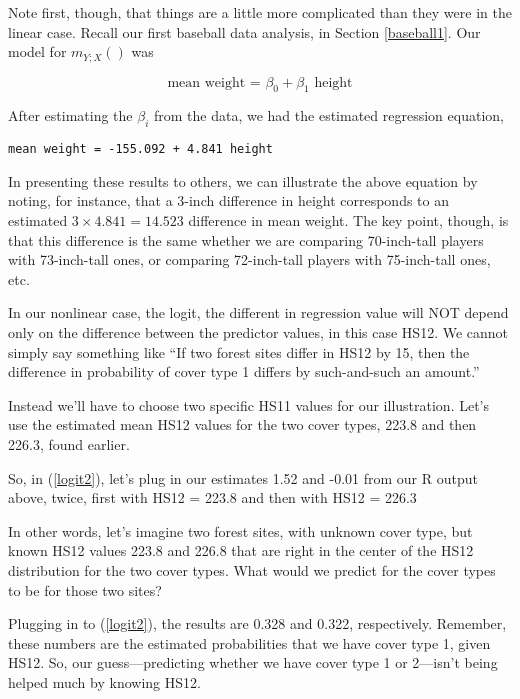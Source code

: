 Note first, though, that things are a little more complicated than they
were in the linear case.  Recall our first baseball data analysis, in
Section \ref{baseball1}.  Our model for $m_{Y;X}()$ was

\begin{equation}
\textrm{mean weight = } 
\beta_0 + \beta_1 \textrm{ height}
\end{equation}

After estimating the $\beta_i$ from the data, we had the estimated
regression equation,

\begin{lstlisting}
mean weight = -155.092 + 4.841 height
\end{lstlisting}

In presenting these results to others, we can illustrate the above
equation by noting, for instance, that a 3-inch difference in height
corresponds to an estimated $3 \times 4.841 = 14.523$ difference in mean
weight.  The key point, though, is that this difference is the same
whether we are comparing 70-inch-tall players with 73-inch-tall ones, or
comparing 72-inch-tall players with 75-inch-tall ones, etc.  

In our nonlinear case, the logit, the different in regression value will
NOT depend only on the difference between the predictor values, in this
case HS12.  We cannot simply say something like ``If two forest sites
differ in HS12 by 15, then the difference in probability of cover type 1
differs by such-and-such an amount.''  

Instead we'll have to choose two specific HS11 values for our
illustration.  Let's use the estimated mean HS12 values for the two
cover types, 223.8 and then 226.3, found earlier.  

So, in (\ref{logit2}), let's plug in our estimates 1.52 and -0.01 from
our R output above, twice, first with HS12 = 223.8 and then with HS12 =
226.3   

In other words, let's imagine two forest sites, with unknown cover type,
but known HS12 values 223.8 and 226.8 that are right in the center of
the HS12 distribution for the two cover types.  What would we predict
for the cover types to be for those two sites?

Plugging in to (\ref{logit2}), the results are 0.328 and 0.322,
respectively.  Remember, these numbers are the estimated probabilities
that we have cover type 1, given HS12.  So, our guess---predicting
whether we have cover type 1 or 2---isn't being helped much by knowing
HS12.

